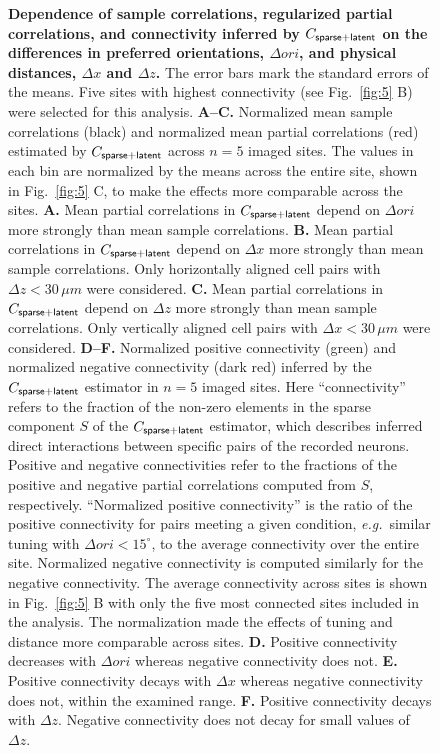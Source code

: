 \begin{figure}
\caption{{\bf Dependence of sample correlations, regularized partial correlations, and connectivity inferred by $C_{\sf sparse+latent}$ on the differences in preferred orientations, $\Delta ori$, and physical distances, $\Delta x$ and $\Delta z$.} The error bars mark the standard errors of the means. Five sites with highest connectivity (see Fig.~\ref{fig:5} B) were selected for this analysis.
{\bf A--C.} Normalized mean sample correlations (black) and normalized mean partial correlations (red) estimated by $C_{\sf sparse+latent}$ across $n=5$ imaged sites. The values in each bin are normalized by the means across the entire site, shown in Fig.~\ref{fig:5} C, to make the effects more comparable across the sites.
{\bf A.} Mean partial correlations in $C_{\sf sparse+latent}$ depend on $\Delta ori$ more strongly than mean sample correlations.
{\bf B.} Mean partial correlations in $C_{\sf sparse+latent}$ depend on $\Delta x$ more strongly than mean sample correlations. Only horizontally aligned cell pairs with $\Delta z<30\,\mu m$ were considered.
{\bf C.} Mean partial correlations in $C_{\sf sparse+latent}$ depend on $\Delta z$ more strongly than mean sample correlations. Only vertically aligned cell pairs with $\Delta x<30\,\mu m$ were considered.    {\bf D--F.} Normalized positive connectivity (green) and normalized negative connectivity (dark red) inferred by the $C_{\sf sparse+latent}$ estimator in $n=5$ imaged sites.
Here ``connectivity'' refers to the fraction of the non-zero elements in the sparse component $S$ of the $C_{\sf sparse+latent}$ estimator, which describes inferred direct interactions between specific pairs of the recorded neurons. Positive and negative connectivities refer to the fractions of the positive and negative partial correlations computed from  $S$, respectively.  ``Normalized positive connectivity'' is the ratio of the positive connectivity for pairs meeting a given condition, \emph{e.g.}~similar tuning with $\Delta ori <15^{\circ}$, to the average connectivity over the entire site.  Normalized negative connectivity is computed similarly for the negative connectivity.  The average connectivity across sites is shown in Fig.~\ref{fig:5} B with only the five most connected sites included in the analysis.  The normalization made the effects of tuning and distance more comparable across sites.
{\bf D.} Positive connectivity decreases with $\Delta ori$ whereas negative connectivity does not.
{\bf E.} Positive connectivity decays with $\Delta x$ whereas negative connectivity does not, within the examined range.
{\bf F.} Positive connectivity decays with $\Delta z$. Negative connectivity does not decay for small values of $\Delta z$.
}
\label{fig:6}
\end{figure}

